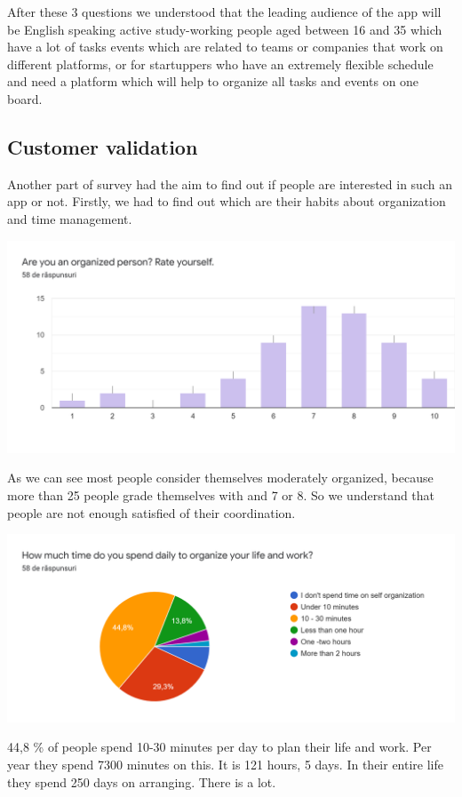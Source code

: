 After these 3 questions we understood that the leading audience of the app will be English speaking active study-working people aged between 16 and 35 which have a lot of tasks events which are related to teams or companies that work on different platforms, or for startuppers who have an extremely flexible schedule and need a platform which will help to organize all tasks and events on one board. 


\subsection{Customer validation}
\par Another part of survey had the aim to find out if people are interested in such an app or not. Firstly, we had to find out which are their habits about organization and time management. 
\par
\includegraphics[width=\textwidth]{CustomerValidation1}
\par As we can see most people consider themselves moderately organized, because more than 25 people grade themselves with and 7 or 8. So we understand that people are not enough satisfied of their coordination.
\par
\includegraphics[width=\textwidth]{CustomerValidation2}
\par 44,8 \% of people spend 10-30 minutes per day to plan their life and work. Per year they spend 7300 minutes on this. It is 121 hours, 5 days. In their entire life they spend 250 days on arranging. There is a lot.
